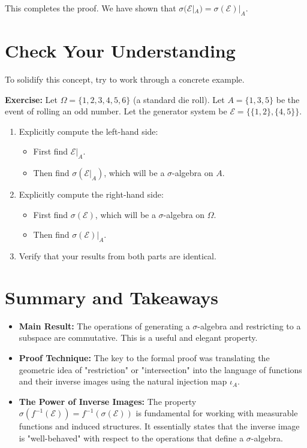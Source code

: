 \documentclass[11pt,a4paper]{article}
\begin{document}
This completes the proof. We have shown that $\sigma(\mathcal{E}|_A) = \sigma(\mathcal{E})|_A$.

\section{Check Your Understanding}

To solidify this concept, try to work through a concrete example.

\textbf{Exercise:} Let $\Omega = \{1, 2, 3, 4, 5, 6\}$ (a standard die roll). Let $A = \{1, 3, 5\}$ be the event of rolling an odd number. Let the generator system be $\mathcal{E} = \{\{1, 2\}, \{4, 5\}\}$.
\begin{enumerate}
    \item Explicitly compute the left-hand side:
    \begin{itemize}
        \item First find $\mathcal{E}|_A$.
        \item Then find $\sigma(\mathcal{E}|_A)$, which will be a $\sigma$-algebra on $A$.
    \end{itemize}
    \item Explicitly compute the right-hand side:
    \begin{itemize}
        \item First find $\sigma(\mathcal{E})$, which will be a $\sigma$-algebra on $\Omega$.
        \item Then find $\sigma(\mathcal{E})|_A$.
    \end{itemize}
    \item Verify that your results from both parts are identical.
\end{enumerate}

\section{Summary and Takeaways}

\begin{itemize}
    \item \textbf{Main Result:} The operations of generating a $\sigma$-algebra and restricting to a subspace are commutative. This is a useful and elegant property.
    \item \textbf{Proof Technique:} The key to the formal proof was translating the geometric idea of "restriction" or "intersection" into the language of functions and their inverse images using the natural injection map $\iota_A$.
    \item \textbf{The Power of Inverse Images:} The property $\sigma(f^{-1}(\mathcal{E})) = f^{-1}(\sigma(\mathcal{E}))$ is fundamental for working with measurable functions and induced structures. It essentially states that the inverse image is "well-behaved" with respect to the operations that define a $\sigma$-algebra.
\end{itemize}
\end{document}
